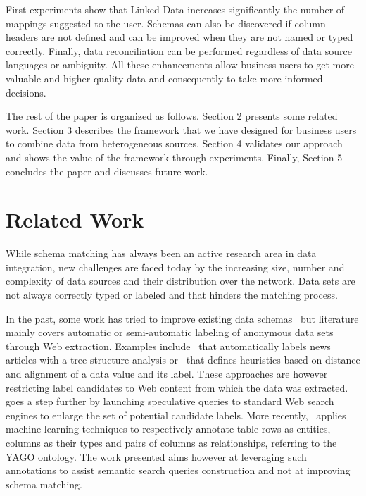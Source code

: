 First experiments show that Linked Data increases significantly the number of mappings suggested to the user. Schemas can also be discovered if column headers are not defined and can be improved when they are not named or typed correctly. Finally, data reconciliation can be performed regardless of data source languages or ambiguity. All these enhancements allow business users to get more valuable and higher-quality data and consequently to take more informed decisions.

The rest of the paper is organized as follows. Section 2 presents some related work. Section 3 describes the framework that we have designed for business users to combine data from heterogeneous sources. Section 4 validates our approach and shows the value of the framework through experiments. Finally, Section 5 concludes the paper and discusses future work.


\section{Related Work}

While schema matching has always been an active research area in data integration, new challenges are faced today by the increasing size, number and complexity of data sources and their distribution over the network. Data sets are not always correctly typed or labeled and that hinders the matching process.

In the past, some work has tried to improve existing data schemas~\cite{ Miller:IEEE:03} but literature mainly covers automatic or semi-automatic labeling of anonymous data sets through Web extraction. Examples include~\cite{Reis:WWW:04} that automatically labels news articles with a tree structure analysis or~\cite{Wang:WWW:03} that defines heuristics based on distance and alignment of a data value and its label. These approaches are however restricting label candidates to Web content from which the data was extracted.~\cite{DaSilva:OTM:07} goes a step further by launching speculative queries to standard Web search engines to enlarge the set of potential candidate labels. More recently,~\cite{Limaye:VLDB:10} applies machine learning techniques to respectively annotate table rows as entities, columns as their types and pairs of columns as relationships, referring to the YAGO ontology. The work presented aims however at leveraging such annotations to assist semantic search queries construction and not at improving schema matching.

